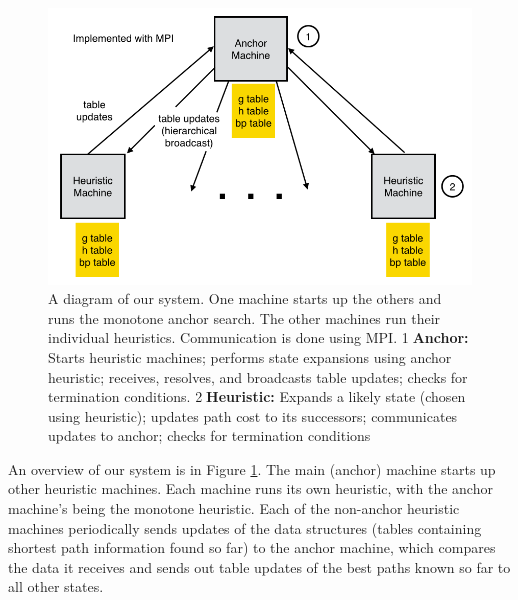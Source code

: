 \documentclass[11pt]{article}
\begin{document}
{\begin{figure}
\centering \includegraphics[width=5.0in]{system-diagram}
\caption{A diagram of our system. One machine starts up the others and runs the monotone anchor search. The other machines run their individual heuristics. Communication is done using MPI. 
\textcircled{1}\textbf{Anchor:} Starts heuristic machines; performs state expansions using anchor heuristic; receives, resolves, and broadcasts table updates; checks for termination conditions. \textcircled{2}\textbf{Heuristic:} Expands a likely state (chosen using heuristic); updates path cost to its successors; communicates updates to anchor; checks for termination conditions}
\label{fig:sysdiag}
\end{figure}

An overview of our system is in Figure \ref{fig:sysdiag}. The main (anchor) machine starts up other heuristic machines. Each machine runs its own heuristic, with the anchor machine's being the monotone heuristic. Each of the non-anchor heuristic machines periodically sends updates of the data structures (tables containing shortest path information found so far) to the anchor machine, which compares the data it receives and sends out table updates of the best paths known so far to all other states.



}
\end{document}
